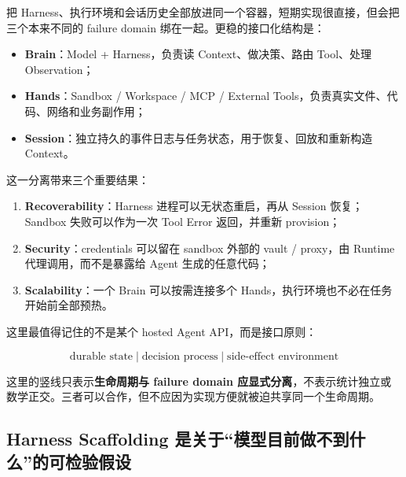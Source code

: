 \documentclass[profile=standard,twoside=false]{ipara-handbook}
\begin{document}
把 Harness、执行环境和会话历史全部放进同一个容器，短期实现很直接，但会把三个本来不同的 failure domain 绑在一起。更稳的接口化结构是：

\begin{itemize}
  \item \textbf{Brain}：Model + Harness，负责读 Context、做决策、路由 Tool、处理 Observation；
  \item \textbf{Hands}：Sandbox / Workspace / MCP / External Tools，负责真实文件、代码、网络和业务副作用；
  \item \textbf{Session}：独立持久的事件日志与任务状态，用于恢复、回放和重新构造 Context。
\end{itemize}

\begin{handbookdiagram}
\centering

\end{handbookdiagram}

这一分离带来三个重要结果：

\begin{enumerate}
  \item \textbf{Recoverability}：Harness 进程可以无状态重启，再从 Session 恢复；Sandbox 失败可以作为一次 Tool Error 返回，并重新 provision；
  \item \textbf{Security}：credentials 可以留在 sandbox 外部的 vault / proxy，由 Runtime 代理调用，而不是暴露给 Agent 生成的任意代码；
  \item \textbf{Scalability}：一个 Brain 可以按需连接多个 Hands，执行环境也不必在任务开始前全部预热。
\end{enumerate}

这里最值得记住的不是某个 hosted Agent API，而是接口原则：

$$
\boxed{
\text{durable state}
\;|\;
\text{decision process}
\;|\;
\text{side-effect environment}
}
$$

这里的竖线只表示\textbf{生命周期与 failure domain 应显式分离}，不表示统计独立或数学正交。三者可以合作，但不应因为实现方便就被迫共享同一个生命周期。

\subsection{Harness Scaffolding 是关于“模型目前做不到什么”的可检验假设}
\end{document}
